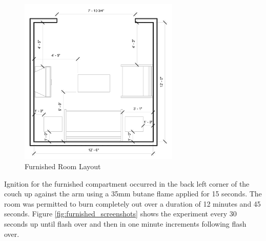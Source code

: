 \documentclass{article}
\begin{document}
\begin{figure}[H]
	\centering
	\includegraphics[width=3in]{0_Images/Vent_Limited_Room/Furnished_Room.jpg}
	\caption{Furnished Room Layout}
	\label{fig:furnished_layout}
\end{figure}

Ignition for the furnished compartment occurred in the back left corner of the couch up against the arm using a 35mm butane flame applied for 15 seconds. The room was permitted to burn completely out over a duration of 12 minutes and 45 seconds. Figure \ref{fig:furnished_screenshots}  shows the experiment every 30 seconds up until flash over and then in one minute increments following flash over. 
\end{document}
